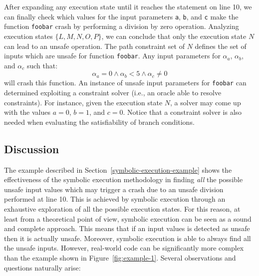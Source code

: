 After expanding any execution state until it reaches the statement on line 10, we can finally check which values for the input parameters {\tt a}, {\tt b}, and {\tt c} make the function {\tt foobar} crash by performing a division by zero operation. Analyzing execution states $\{L, M, N, O, P\}$, we can conclude that only the execution state $N$ can lead to an unsafe operation. The path constraint set of $N$ defines the set of inputs which are unsafe for function {\tt foobar}. Any input parameters for $\alpha_a$, $\alpha_b$, and $\alpha_c$ such that:
 \[ \alpha_a = 0 \wedge \alpha_b < 5 \wedge \alpha_c \neq 0 \]
will crash this function. An instance of unsafe input parameters for {\tt foobar} can determined exploiting a constraint solver (i.e., an oracle able to resolve constraints). For instance, given the execution state $N$, a solver may come up with the values $a = 0$, $b = 1$, and $c = 0$. Notice that a constraint solver is also needed when evaluating the satisfiability of branch conditions. 

\subsection{Discussion}
\label{example-discussion}

The example described in Section~\ref{symbolic-execution-example} shows the effectiveness of the symbolic execution methodology in finding {\em all} the possible unsafe input values which may trigger a crash due to an unsafe division performed at line 10. This is achieved by symbolic execution through an exhaustive exploration of all the possible execution states. For this reason, at least from a theoretical point of view, symbolic execution can be seen as a sound and complete approach. This means that if an input values is detected as unsafe then it is actually unsafe. Moreover, symbolic execution is able to always find all the unsafe inputs. However, real-world code can be significantly more complex than the example shown in Figure~\ref{fig:example-1}. Several observations and questions naturally arise:


